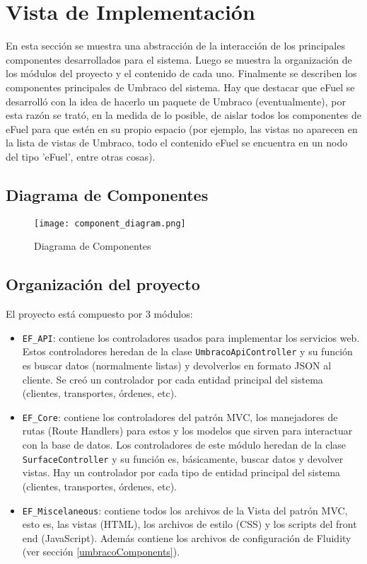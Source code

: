 \section{Vista de Implementación} \label{vistaImplementacion}
En esta sección se muestra una abstracción de la interacción de los principales componentes desarrollados para el sistema. Luego se muestra la organización de los módulos del proyecto y el contenido de cada uno. Finalmente se describen los componentes principales de Umbraco del sistema. Hay que destacar que eFuel se desarrolló con la idea de hacerlo un paquete de Umbraco (eventualmente), por esta razón se trató, en la medida de lo posible, de aislar todos los componentes de eFuel para que estén en su propio espacio (por ejemplo, las vistas no aparecen en la lista de vistas de Umbraco, todo el contenido eFuel se encuentra en un nodo del tipo 'eFuel', entre otras cosas).
    
\subsection{Diagrama de Componentes}

\begin{figure}[H]
    \texttt{[image: component\_diagram.png]}
    \caption{Diagrama de Componentes}
    \label{fig:component_diagram}
    \centering
\end{figure}

\subsection{Organización del proyecto}
El proyecto está compuesto por 3 módulos:

\begin{itemize}
    \item \verb|EF_API|: contiene los controladores usados para implementar los servicios web. Estos controladores heredan de la clase \verb|UmbracoApiController| y su función es buscar datos (normalmente listas) y devolverlos en formato JSON al cliente. Se creó un controlador por cada entidad principal del sistema (clientes, transportes, órdenes, etc).
    \item \verb|EF_Core|: contiene los controladores del patrón MVC, los manejadores de rutas (Route Handlers) para estos y los modelos que sirven para interactuar con la base de datos. Los controladores de este módulo heredan de la clase \verb|SurfaceController| y su función es, básicamente, buscar datos y devolver vistas. Hay un controlador por cada tipo de entidad principal del sistema (clientes, transportes, órdenes, etc). 
    \item \verb|EF_Miscelaneous|: contiene todos los archivos de la Vista del patrón MVC, esto es, las vistas (HTML), los archivos de estilo (CSS) y los scripts del front end (JavaScript). Además contiene los archivos de configuración de Fluidity (ver sección \ref{umbracoComponents}).
\end{itemize}

